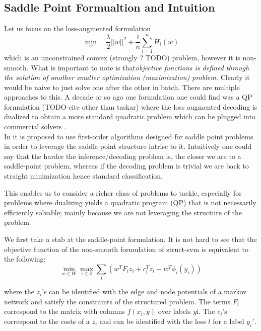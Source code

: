 \subsection{Saddle Point Formualtion and Intuition}
Let us focus on the loss-augmented formulation
\begin{equation}
  \min_{w} \quad\frac{\lambda}{2}||w||^{2}+ \frac{1}{n}\sum_{i=1}^{n}{H}_{i}(w)
\end{equation}
which is an unconstrained convex (strongly ? TODO) problem, however it is
non-smooth. What is important to note is that\emph{objective functions is
defined through the solution of another smaller optimization (maximization)
problem.} Clearly it would be naive to just solve one after the other in batch.
There are multiple approaches to this. A decade or so ago one formulation one
could find was a QP formulation (TODO cite other than taskar) where the loss
augmented decoding is dualized to obtain a more standard quadratic problem which
can be plugged into commercial solvers
\citep{taskarStructuredPredictionDual2006}.\\

In \citet{taskarStructuredPredictionDual2006} it is proposed to use first-order
algorithms designed for saddle point problems in order to leverage the saddle
point structure intrisc to it. Intuitively one could say that the harder the
inference/decoding problem is, the closer we are to a saddle-point problem,
whereas if the decoding problem is trivial we are back to straight minimization
hence standard classification.

This enables us to consider a richer class of problems to tackle, especially for
problems where dualizing yields a quadratic program (QP) that is not necessarily
efficiently solvable; mainly because we are not leveraging the structure of the
problem.

We first take a stab at the saddle-point formulation. It is not hard
to see that the objective function of the non-smooth formulation of
struct-svm is equivalent to the following:
\begin{equation}
  \min_{ w \in {W}} \max_{ z \in {Z}} \sum_i \left( 
w^T  F_i  z_i +  c_i^T  z_i -  w^T  \phi _i( y_i)
\right)
  \label{saddle_point}
\end{equation}

where the $ z_i$'s can be identified with the edge and node potentials of a
markov network and satisfy the constraints of the structured problem. The terms
$ F_i$ correspond to the matrix with columns $f( x_i,  y)$ over
labels $ y$i. The $ c_i$'s correspond to the costs of a $ z_i$ and
can be identified with the loss $l$ for a label $ y_i'$.


